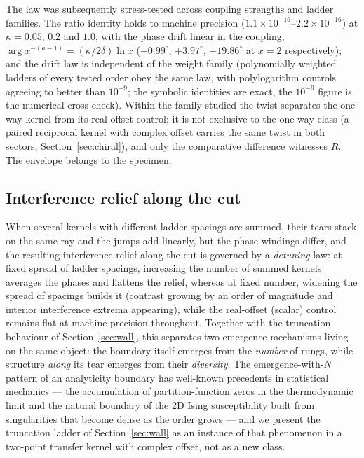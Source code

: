 \documentclass[11pt,a4paper]{article}
\begin{document}
The law was subsequently stress-tested across coupling strengths and
ladder families. The ratio identity holds to machine precision
($1.1\times10^{-16}$--$2.2\times10^{-16}$) at $\kappa = 0.05$, $0.2$ and
$1.0$, with the phase drift linear in the coupling,
$\arg x^{-(a-1)} = (\kappa/2\delta)\ln x$
($+0.99^\circ$, $+3.97^\circ$, $+19.86^\circ$ at $x = 2$ respectively);
and the drift law is independent of the weight family (polynomially
weighted ladders of every tested order obey the same law, with
polylogarithm controls agreeing to better than $10^{-9}$; the symbolic
identities are exact, the $10^{-9}$ figure is the numerical cross-check).
Within the family studied the twist separates the one-way kernel from its
real-offset control; it is not exclusive to the one-way class (a paired
reciprocal kernel with complex offset carries the same twist in both
sectors, Section~\ref{sec:chiral}), and only the comparative difference
witnesses $R$. The envelope belongs to the specimen.

\subsection{Interference relief along the cut}
\label{sec:relief}

When several kernels with
different ladder spacings are summed, their tears stack on the same ray
and the jumps add linearly, but the phase windings differ, and the
resulting interference relief along the cut is governed by a
\emph{detuning} law: at fixed spread of ladder spacings, increasing the
number of summed kernels averages the phases and flattens the relief,
whereas at fixed number, widening the spread of spacings builds it
(contrast growing by an order of magnitude and interior interference
extrema appearing), while the real-offset (scalar) control remains flat at
machine precision throughout. Together with the truncation behaviour of
Section~\ref{sec:wall}, this separates two emergence mechanisms living
on the same object: the boundary itself emerges from the \emph{number}
of rungs, while structure \emph{along} its tear emerges from their
\emph{diversity}. The emergence-with-$N$ pattern of an analyticity
boundary has well-known precedents in statistical mechanics --- the
accumulation of partition-function zeros in the thermodynamic limit
\cite{LeeYang1952} and the natural boundary of the 2D Ising
susceptibility built from singularities that become dense as the order
grows \cite{Nickel1999} --- and we present the truncation ladder of
Section~\ref{sec:wall} as an instance of that phenomenon in a
two-point transfer kernel with complex offset, not as a new class.
\end{document}
